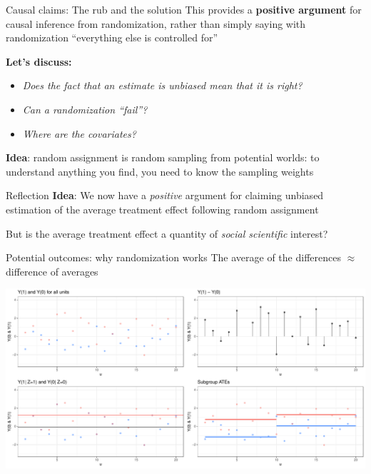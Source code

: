 \documentclass[
  11pt,
  ignorenonframetext,
]{beamer}
\providecommand{\tightlist}{%
  \setlength{\itemsep}{0pt}\setlength{\parskip}{0pt}}\usepackage{longtable,booktabs,array}
\begin{document}
\begin{frame}{Causal claims: The rub and the solution}
\protect\hypertarget{causal-claims-the-rub-and-the-solution-2}{}
This provides a \textbf{positive argument} for causal inference from
randomization, rather than simply saying with randomization ``everything
else is controlled for''

\textbf{Let's discuss:}

\begin{itemize}
\tightlist
\item
  \emph{Does the fact that an estimate is unbiased mean that it is
  right?}
\item
  \emph{Can a randomization ``fail''?}
\item
  \emph{Where are the covariates?}
\end{itemize}

\textbf{Idea}: random assignment is random sampling from potential
worlds: to understand anything you find, you need to know the sampling
weights
\end{frame}

\begin{frame}{Reflection}
\protect\hypertarget{reflection}{}
\textbf{Idea}: We now have a \emph{positive} argument for claiming
unbiased estimation of the average treatment effect following random
assignment

But is the average treatment effect a quantity of \emph{social
scientific} interest?
\end{frame}

\begin{frame}{Potential outcomes: why randomization works}
\protect\hypertarget{potential-outcomes-why-randomization-works}{}
The average of the differences \(\approx\) difference of averages

\includegraphics{0_lectures_files/figure-beamer/unnamed-chunk-222-1.pdf}
\end{frame}
\end{document}
